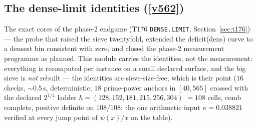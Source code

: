 \documentclass[11pt,a4paper]{article}
\begin{document}
\subsection{The dense-limit identities (\texorpdfstring{\vref{v562}}{v562})}\label{sec:v562}
The exact cores of the phase-2 endgame (T176 \texttt{DENSE.LIMIT},
Section~\ref{sec:t176}) --- the probe that raised the sieve twentyfold, extended the
deficit(dens) curve to a densest bin consistent with zero, and closed the phase-2
measurement programme as planned. This module carries the identities, not the
measurement: everything is recomputed per instance on a small declared surface, and
the big sieve is \emph{not} rebuilt --- the identities are sieve-size-free, which is
their point  ($16$ checks, ${\sim}0.5$\,s,
deterministic; $18$ prime-power anchors in $[40,565]$ crossed with the declared
$2^{1/4}$ ladder $h=(128,152,181,215,256,304)$ $=108$ cells, comb complete, positive
definite on $108/108$; the one arithmetic input $\kappa=0.038821$ verified at every
jump point of $\psi(x)/x$ on the table).
\end{document}
